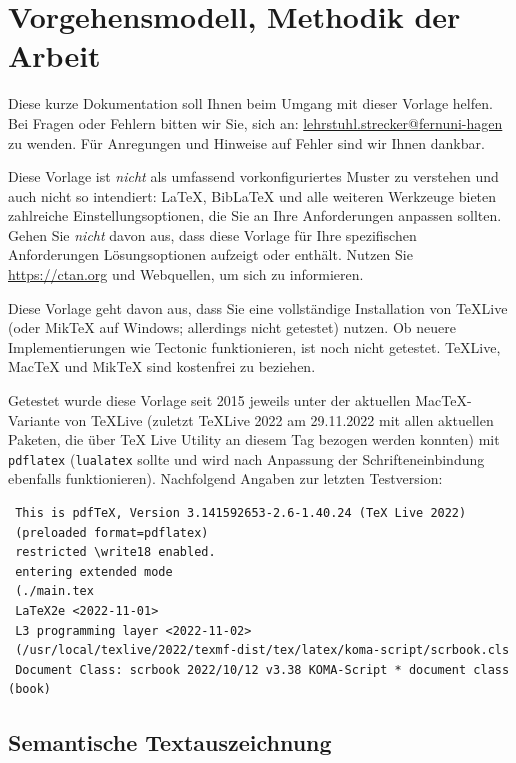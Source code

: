 

\lstset{language=C}

\chapter{Vorgehensmodell, Methodik der Arbeit}

Diese kurze Dokumentation soll Ihnen beim Umgang mit dieser Vorlage helfen. Bei Fragen oder Fehlern bitten wir Sie, sich an: \href{mailto:lehrstuhl.strecker@fernuni-hagen}{lehrstuhl.strecker@fernuni-hagen} zu wenden. Für Anregungen und Hinweise auf Fehler sind wir Ihnen dankbar.

Diese Vorlage ist \emph{nicht} als umfassend vorkonfiguriertes Muster zu verstehen und auch nicht so intendiert: LaTeX, BibLaTeX und alle weiteren Werkzeuge bieten zahlreiche Einstellungsoptionen, die Sie an Ihre Anforderungen anpassen sollten. Gehen Sie \emph{nicht} davon aus, dass diese Vorlage für Ihre spezifischen Anforderungen Lösungsoptionen aufzeigt oder enthält. Nutzen Sie \url{https://ctan.org} und Webquellen, um sich zu informieren.

Diese Vorlage geht davon aus, dass Sie eine vollständige Installation von TeXLive (oder MikTeX auf Windows; allerdings nicht getestet) nutzen. Ob neuere Implementierungen wie Tectonic funktionieren, ist noch nicht getestet. TeXLive, MacTeX und MikTeX sind kostenfrei zu beziehen.

Getestet wurde diese Vorlage seit 2015 jeweils unter der aktuellen MacTeX-Variante von TeXLive (zuletzt TeXLive 2022 am 29.11.2022 mit allen aktuellen Paketen, die über TeX Live Utility an diesem Tag bezogen werden konnten) mit \verb|pdflatex| (\verb|lualatex| sollte und wird nach Anpassung der Schrifteneinbindung ebenfalls funktionieren). Nachfolgend Angaben zur letzten Testversion:

\begin{verbatim}
 This is pdfTeX, Version 3.141592653-2.6-1.40.24 (TeX Live 2022) 
 (preloaded format=pdflatex)
 restricted \write18 enabled.
 entering extended mode
 (./main.tex
 LaTeX2e <2022-11-01>
 L3 programming layer <2022-11-02>
 (/usr/local/texlive/2022/texmf-dist/tex/latex/koma-script/scrbook.cls
 Document Class: scrbook 2022/10/12 v3.38 KOMA-Script * document class (book)

\end{verbatim}




\section{Semantische Textauszeichnung}
\label{sec:semant-textauszeichnung}

